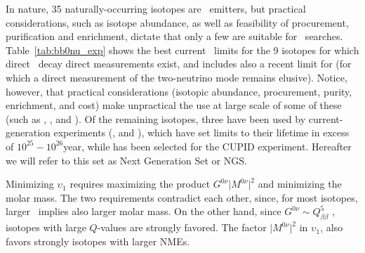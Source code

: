 In nature, 35 naturally-occurring isotopes are \bb\ emitters, but practical considerations, such as isotope abundance, as well as feasibility of procurement,   purification and enrichment, dictate that only a few are suitable for \bbonu\ searches. 
Table~\ref{tab:bb0nu_exp} shows the best current \bbonu\ limits for the 9 isotopes for which direct \bbtnu\ decay direct measurements exist, and includes also a recent limit for   (for which a direct measurement of the two-neutrino mode remains elusive). Notice, however, that practical considerations (isotopic abundance, procurement, purity, enrichment, and cost) make unpractical the use at large scale of some of these (such as , ,  and ). Of the remaining isotopes, three have been used by current-generation experiments (,  and ), which have set limits to their lifetime in excess of $10^{25}-10^{26}$year, while  has been selected for the CUPID experiment. Hereafter we will refer to this set as Next Generation Set or NGS. 


Minimizing $\upsilon_1$ requires maximizing the product $G^{0\nu}\lvert M^{0\nu}\rvert^2$ and minimizing the molar mass. The two requirements contradict each other, since, for most isotopes, larger \Qbb\ implies also larger molar mass. On the other hand, since $G^{0\nu} \sim Q_{\beta\beta}^5$ \cite{Vogel:2008sx}, isotopes with large $Q$-values are strongly favored. The factor $\lvert M^{0\nu}\rvert^2$ in $\upsilon_1$, also favors strongly isotopes with larger NMEs. 


%
%

